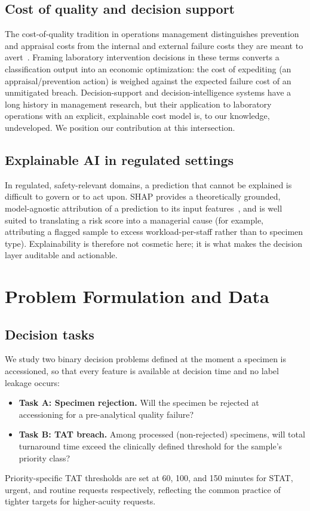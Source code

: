 \documentclass[journal]{IEEEtran}
\begin{document}
\subsection{Cost of quality and decision support}
The cost-of-quality tradition in operations management distinguishes prevention
and appraisal costs from the internal and external failure costs they are meant to
avert~\cite{crosby1979}. Framing laboratory intervention decisions in these terms
converts a classification output into an economic optimization: the cost of
expediting (an appraisal/prevention action) is weighed against the expected
failure cost of an unmitigated breach. Decision-support and decision-intelligence
systems have a long history in management research, but their application to
laboratory operations with an explicit, explainable cost model is, to our
knowledge, undeveloped. We position our contribution at this intersection.

\subsection{Explainable AI in regulated settings}
In regulated, safety-relevant domains, a prediction that cannot be explained is
difficult to govern or to act upon. SHAP provides a theoretically grounded,
model-agnostic attribution of a prediction to its input features~\cite{shap2017},
and is well suited to translating a risk score into a managerial cause (for
example, attributing a flagged sample to excess workload-per-staff rather than to
specimen type). Explainability is therefore not cosmetic here; it is what makes the
decision layer auditable and actionable.

\section{Problem Formulation and Data}\label{sec:data}

\subsection{Decision tasks}
We study two binary decision problems defined at the moment a specimen is
accessioned, so that every feature is available at decision time and no label
leakage occurs:
\begin{itemize}
\item \textbf{Task A: Specimen rejection.} Will the specimen be rejected at
accessioning for a pre-analytical quality failure?
\item \textbf{Task B: TAT breach.} Among processed (non-rejected) specimens,
will total turnaround time exceed the clinically defined threshold for the
sample's priority class?
\end{itemize}
Priority-specific TAT thresholds are set at 60, 100, and 150 minutes for STAT,
urgent, and routine requests respectively, reflecting the common practice of
tighter targets for higher-acuity requests.
\end{document}
